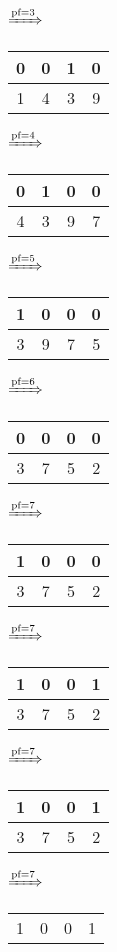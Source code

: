 \documentclass{article}
\begin{document}
\begin{enumerate}
\begin{tabular}{|c|c|c|c|}
      \end{tabular}
      $\xRightarrow{\text{pf}=3}$
      \begin{tabular}{|c|c|c|c|}
         \hline
         0 & 0 & 1 & 0\\
         \hline
         1 & 4 & 3 & 9\\
         \hline
      \end{tabular}
      $\xRightarrow{\text{pf}=4}$
      \begin{tabular}{|c|c|c|c|}
         \hline
         0 & 1 & 0 & 0\\
         \hline
         4 & 3 & 9 & 7\\
         \hline
      \end{tabular}
      $\xRightarrow{\text{pf}=5}$
      \begin{tabular}{|c|c|c|c|}
         \hline
         1 & 0 & 0 & 0\\
         \hline
         3 & 9 & 7 & 5\\
         \hline
      \end{tabular}
      $\xRightarrow{\text{pf}=6}$
      \begin{tabular}{|c|c|c|c|}
         \hline
         0 & 0 & 0 & 0\\
         \hline
         3 & 7 & 5 & 2\\
         \hline
      \end{tabular}
      $\xRightarrow{\text{pf}=7}$
      \begin{tabular}{|c|c|c|c|}
         \hline
         1 & 0 & 0 & 0\\
         \hline
         3 & 7 & 5 & 2\\
         \hline
      \end{tabular}
      $\xRightarrow{\text{pf}=7}$
      \begin{tabular}{|c|c|c|c|}
         \hline
         1 & 0 & 0 & 1\\
         \hline
         3 & 7 & 5 & 2\\
         \hline
      \end{tabular}
      $\xRightarrow{\text{pf}=7}$
      \begin{tabular}{|c|c|c|c|}
         \hline
         1 & 0 & 0 & 1\\
         \hline
         3 & 7 & 5 & 2\\
         \hline
      \end{tabular}
      $\xRightarrow{\text{pf}=7}$
      \begin{tabular}{|c|c|c|c|}
         \hline
         1 & 0 & 0 & 1\\

\end{tabular}
\end{enumerate}
\end{document}
